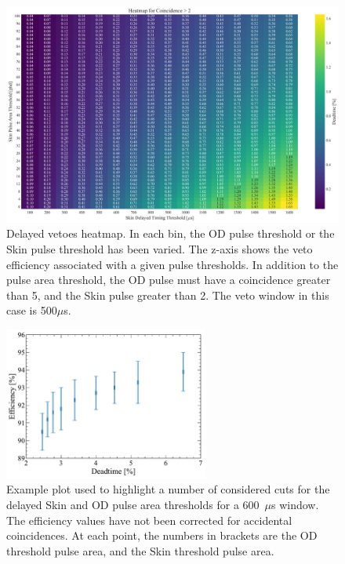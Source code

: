 \begin{figure}
	\centering
	\includegraphics[width=\textwidth]{figures/VetoEfficiency/Skin_Deadtime_thesis.png}
	\caption{Delayed vetoes heatmap.
		In each bin, the OD pulse threshold or the Skin pulse threshold has been varied.
		The z-axis shows the veto efficiency associated with a given pulse thresholds.
		In addition to the pulse area threshold, the OD pulse must have a coincidence greater than 5, and the Skin pulse greater than 2.
		The veto window in this case is 500$\mu$s.}
	\label{fig:VetoEff/skin_delayed_veto_heatmap}
\end{figure}
\fi

\begin{figure}[!ht]
	\centering
	\includegraphics[width=0.6\textwidth]{figures/VetoEfficiency/DeadEffThresholdTest.pdf}
	\caption[Example plot used to highlight a number of considered cuts for the delayed Skin and OD pulse area thresholds for a 600~$\mu$s window.]{Example plot used to highlight a number of considered cuts for the delayed Skin and OD pulse area thresholds for a 600~$\mu$s window. The efficiency values have not been corrected for accidental coincidences. At each point, the numbers in brackets are the OD threshold pulse area, and the Skin threshold pulse area.}
	\label{fig:VetoEff/veto_cut_optimisation}
\end{figure}


